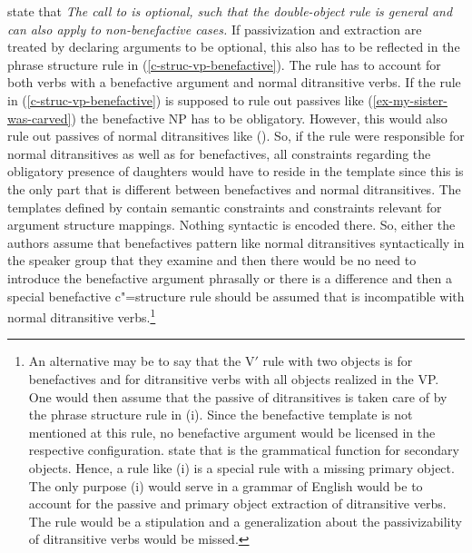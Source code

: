 \citet[]{AGT2014a} state that \emph{The call to  is optional, such
that the double-object rule is general and can also apply to non-benefactive cases.} If
passivization and extraction are treated by declaring arguments to be optional, this also has to be
reflected in the phrase structure rule in (\ref{c-struc-vp-benefactive}). The rule has to account
for both verbs with a benefactive argument and normal ditransitive verbs.
If the rule in (\ref{c-struc-vp-benefactive}) is supposed to rule out passives like
(\ref{ex-my-sister-was-carved}) the benefactive NP has to be obligatory. However, this would also rule out
passives of normal ditransitives like ().
\z
So, if the rule were responsible for normal ditransitives as well as for benefactives, all
constraints regarding the obligatory presence of daughters would have to reside in the template
since this is the only part that is different between benefactives and normal ditransitives. The
templates defined by \citet{AGT2014a} contain semantic constraints and constraints relevant for
argument structure mappings. Nothing syntactic is encoded there. So, either the authors assume that
benefactives pattern like normal ditransitives syntactically in the speaker group that they
examine and then there would be no need to introduce the benefactive argument phrasally or there is
a difference and then a special benefactive c"=structure rule should be assumed that is incompatible
with normal ditransitive verbs.\footnote{%
 An alternative may be to say that the V$'$ rule with two objects is for benefactives and for
 ditransitive verbs with all objects realized in the VP. One would then assume that the passive of
 ditransitives is taken care of by the phrase structure rule in (i).
\ea\label{c-struc-vp-ditransitive-passive}
\z
Since the benefactive template is not mentioned at this rule, no benefactive argument would be
licensed in the respective configuration. \citet*{BATW2015a} state that \objtheta is the grammatical
function for secondary objects. Hence, a rule like (i) is a special rule with a missing primary
object. The only purpose (i) would serve in a grammar of English would be to account for the passive
and primary object extraction of ditransitive verbs. The rule would be a stipulation and a
generalization about the passivizability of ditransitive verbs would be missed.
}



